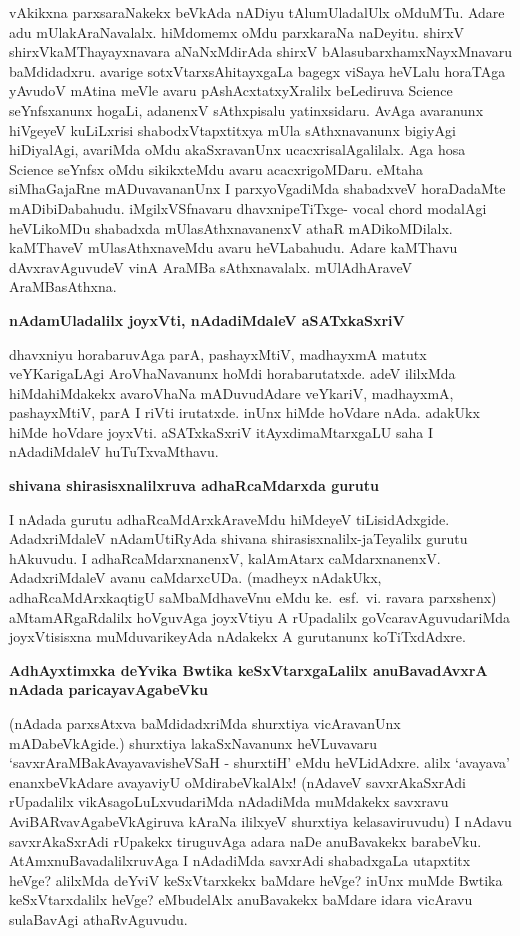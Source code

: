 \noindent
vAkikxna parxsaraNakekx beVkAda nADiyu tAlumUladalUlx oMduMTu. Adare adu mUlakAraNavalalx. hiMdomemx oMdu parxkaraNa naDeyitu. shirxV shirxVkaMThayayxnavara aNaNxMdirAda shirxV bAlasubarxhamxNayxMnavaru baMdidadxru. avarige sotxVtarxsAhitayxgaLa bagegx viSaya heVLalu horaTAga yAvudoV mAtina meVle avaru pAshAcxtatxyXralilx beLediruva {\rm Science} seYnfsxanunx hogaLi, adanenxV sAthxpisalu yatinxsidaru. AvAga avaranunx hiVgeyeV kuLiLxrisi shabodxVtapxtitxya mUla sAthxnavanunx bigiyAgi hiDiyalAgi, avariMda oMdu akaSxravanUnx ucacxrisalAgalilalx. Aga hosa {\rm Science} seYnfsx oMdu sikikxteMdu avaru acacxrigoMDaru. eMtaha siMhaGajaRne mADuvavananUnx I parxyoVgadiMda shabadxveV horaDadaMte mADibiDabahudu. iMgilxVSfnavaru dhavxnipeTiTxge- {\rm vocal chord} modalAgi heVLikoMDu shabadxda mUlasAthxnavanenxV athaR mADikoMDilalx. kaMThaveV mUlasAthxnaveMdu avaru heVLabahudu. Adare kaMThavu dAvxravAguvudeV vinA AraMBa sAthxnavalalx. mUlAdhAraveV AraMBasAthxna. 

{\bigskip
\noindent
{\large\bf nAdamUladalilx joyxVti, nAdadiMdaleV aSATxkaSxriV}}\label{page172}
\medskip

\noindent
dhavxniyu horabaruvAga parA, pashayxMtiV, madhayxmA matutx veYKarigaLAgi AroVhaNavanunx hoMdi horabarutatxde. adeV ililxMda hiMdahiMdakekx avaroVhaNa mADuvudAdare veYkariV, madhayxmA, pashayxMtiV, parA I riVti irutatxde. inUnx hiMde hoVdare nAda. adakUkx hiMde hoVdare joyxVti. aSATxkaSxriV itAyxdi\-maMtarxgaLU saha I nAdadiMdaleV huTuTxvaMthavu.

{\bigskip
\noindent
{\large\bf shivana shirasisxnalilxruva adhaRcaMdarxda gurutu}}\label{page172}
\medskip

\noindent
I nAdada gurutu adhaRcaMdArxkAraveMdu hiMdeyeV tiLisidAdxgide. AdadxriMdaleV nAdamUtiR\-yAda shivana shirasisxnalilx-jaTeyalilx gurutu hAkuvudu. I adhaRcaMdarxnanenxV, kalAmAtarx caMdarx\-nanenxV. AdadxriMdaleV avanu caMdarxcUDa. (madheyx nAdakUkx, adhaRcaMdArxkaqtigU saMbaMdhaveVnu eMdu ke.~esf.~vi. ravara parxshenx) aMtamARgaRdalilx hoVguvAga joyxVtiyu A rUpadalilx goVcaravAguvuda\-riMda joyxVtisisxna muMduvarikeyAda nAdakekx A gurutanunx koTiTxdAdxre.

{\bigskip
\noindent
{\large\bf AdhAyxtimxka deYvika Bwtika keSxVtarxgaLalilx anuBavadAvxrA nAdada paricayavAga\break\-beVku}}\label{page172}
\medskip

\noindent
(nAdada parxsAtxva baMdidadxriMda shurxtiya vicAravanUnx mADabeVkAgide.) shurxtiya lakaSxNavanunx heVLu\-vavaru `savxrAraMBakAvayavavisheVSaH\label{172} - shurxtiH' eMdu heVLidAdxre. alilx `avayava' enanxbeVkA\-dare avayaviyU oMdirabeVkalAlx! (nAdaveV savxrAkaSxrAdi rUpadalilx vikAsagoLuLxvudariMda nAda\-diMda muMdakekx savxravu AviBARvavAgabeVkAgiruva kAraNa ililxyeV shurxtiya kelasaviruvudu) I nAdavu savxrAkaSx\-rAdi rUpakekx tiruguvAga adara naDe anuBavakekx barabeVku. AtAmxnuBavadalilxruvAga I nAdadiMda savxrAdi shabadxgaLa utapxtitx heVge? alilxMda deYviV keSxVtarxkekx baMdare heVge? inUnx muMde Bwtika keSxVtarxdalilx heVge? eMbudelAlx anuBavakekx baMdare idara vicAravu sulaBavAgi athaRvAguvudu.

